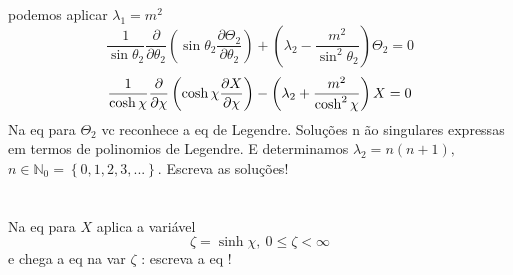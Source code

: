 \documentclass[a4paper,12pt]{article}
\begin{document}
podemos aplicar $\lambda _{1}=m^{2}$%
\begin{equation*}
\frac{1}{\sin \theta _{2}}\frac{\partial }{\partial \theta _{2}}\left( \sin
\theta _{2}\frac{\partial \Theta _{2}}{\partial \theta _{2}}\right) +\left(
\lambda _{2}-\frac{m^{2}}{\sin ^{2}\theta _{2}}\right) \Theta _{2}=0
\end{equation*}%
\begin{equation*}
\frac{1}{\cosh \chi }\frac{\partial }{\partial \chi }\left( \cosh \chi \frac{%
\partial X}{\partial \chi }\right) -\left( \lambda _{2}+\frac{m^{2}}{\cosh
^{2}\chi }\right) X=0
\end{equation*}%
Na eq para $\Theta _{2}$ vc reconhece a eq de Legendre. Solu\c{c}\~{o}es n%
\~{a}o singulares expressas em termos de polinomios de Legendre. E
determinamos $\lambda _{2}=n\left( n+1\right) ,$ $n\in \mathbb{N}%
_{0}=\left\{ 0,1,2,3,...\right\} .$ Escreva as solu\c{c}\~{o}es!

$\frac{{}}{{}}$

Na eq para $X$ aplica a vari\'{a}vel 
\begin{equation*}
\zeta =\sinh \chi ,\ 0\leq \zeta <\infty 
\end{equation*}%
e chega a eq na var $\zeta $ : escreva a eq !%
\begin{equation*}
\end{equation*}
\end{document}
